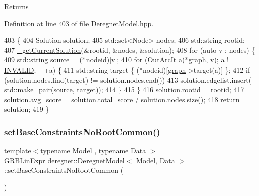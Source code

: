 \begin{DoxyReturn}{Returns}

\end{DoxyReturn}


Definition at line 403 of file Deregnet\+Model.\+hpp.


\begin{DoxyCode}
403                                                         \{
404     Solution solution;
405     std::set<Node> nodes;
406     std::string rootid;
407     \hyperlink{classderegnet_1_1DeregnetModel_a8b4f6be55c874c039c8180c1288f0319}{\_getCurrentSolution}(&rootid, &nodes, &solution);
408     \textcolor{keywordflow}{for} (\textcolor{keyword}{auto} v : nodes) \{
409         std::string source = (*nodeid)[v];
410         \textcolor{keywordflow}{for} (\hyperlink{namespacederegnet_a253cef939ea250e4cc0c967cd0117853}{OutArcIt} a(*\hyperlink{classderegnet_1_1DeregnetModel_a3cd2f54b8e061ef5bed32708d9bc1ef1}{graph}, v); a != \hyperlink{usinglemon_8hpp_adf770fe2eec438e3758ffe905dbae208}{INVALID}; ++a) \{
411             std::string target \{ (*nodeid)[\hyperlink{classderegnet_1_1DeregnetModel_a3cd2f54b8e061ef5bed32708d9bc1ef1}{graph}->target(a)] \};
412             \textcolor{keywordflow}{if} (solution.nodes.find(target) != solution.nodes.end())
413                 solution.edgelist.insert( std::make\_pair(source, target));
414         \}
415     \}
416     solution.rootid = rootid;
417     solution.avg\_score = solution.total\_score / solution.nodes.size();
418     \textcolor{keywordflow}{return} solution;
419 \}
\end{DoxyCode}
\mbox{\label{classderegnet_1_1DeregnetModel_a5f6cc627b7a800f3d9d77f5f859d241c}} 
\subsubsection{\texorpdfstring{set\+Base\+Constraints\+No\+Root\+Common()}{setBaseConstraintsNoRootCommon()}}
{\footnotesize\ttfamily template$<$typename Model , typename Data $>$ \\
G\+R\+B\+Lin\+Expr \hyperlink{classderegnet_1_1DeregnetModel}{deregnet\+::\+Deregnet\+Model}$<$ Model, \hyperlink{avgdrgnt_8cpp_a1d1235306db276e9b36acba1db1509e8}{Data} $>$\+::set\+Base\+Constraints\+No\+Root\+Common (\begin{DoxyParamCaption}{ }\end{DoxyParamCaption})\hspace{0.3cm}{\ttfamily [private]}}



